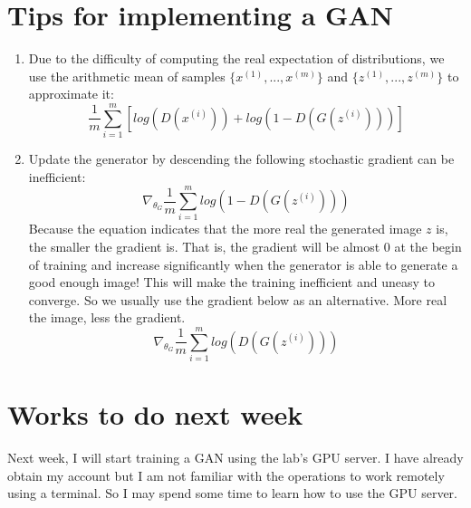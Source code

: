 \documentclass{article} %
\begin{document}
\section{Tips for implementing a GAN}

\begin{enumerate}
    \item Due to the difficulty of computing the real expectation of distributions, we use the arithmetic mean of samples $\{x^(1),...,x^{(m)}\}$ and $\{z^{(1)},...,z^{(m)}\}$ to approximate it:
        \begin{equation}
            \frac{1}{m}\sum_{i=1}^{m}[log(D(x^{(i)}))+log(1-D(G(z^{(i)})))]
        \end{equation}
    \item Update the generator by descending the following stochastic gradient can be inefficient:
        \begin{equation}
            \nabla_{\theta_{G}}\frac{1}{m}\sum_{i=1}^{m}log(1-D(G(z^{(i)})))
        \end{equation}
    Because the equation indicates that the more real the generated image $z$ is, the smaller the gradient is. That is, the gradient will be almost $0$ at the begin of training and increase significantly when the generator is able to generate a good enough image! This will make the training inefficient and uneasy to converge.
    So we usually use the gradient below as an alternative. More real the image, less the gradient.
        \begin{equation}
            \nabla_{\theta_{G}}\frac{1}{m}\sum_{i=1}^{m}log(D(G(z^{(i)})))
        \end{equation}
\end{enumerate}

\section{Works to do next week}

Next week, I will start training a GAN using the lab's GPU server. I have already obtain my account but I am not familiar with the operations to work remotely using a terminal. So I may spend some time to learn how to use the GPU server. 
\end{document}
